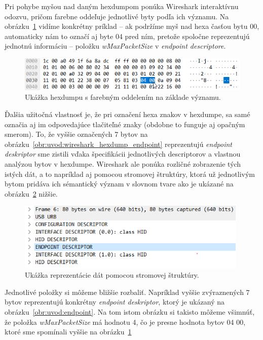 Pri pohybe myšou nad daným hexdumpom ponúka Wireshark interaktívnu odozvu, pričom farebne oddeľuje jednotlivé byty podľa ich významu. Na obrázku~\ref{obr:uvod:wireshark_hexdump_data_selection} vidíme konkrétny príklad -- ak podržíme myš nad hexa časťou bytu 00, automaticky nám to označí aj byte 04 pred ním, pretože spoločne reprezentujú jednotnú informáciu -- položku \textit{wMaxPacketSize} v \textit{endpoint descriptore}.

\begin{figure}[!htb]
	\centering
	\includegraphics[width=12cm]{img/uvod_wireshark_data_selection}
	\caption{Ukážka hexdumpu s farebným oddelením na základe významu.}
	\label{obr:uvod:wireshark_hexdump_data_selection}
\end{figure}

Ďalšia užitočná vlastnosť je, že pri označení hexa znakov v hexdumpe, sa samé označia aj im odpovedajúce tlačiteľné znaky (obdobne to funguje aj opačným smerom). To, že vyššie označených 7 bytov na obrázku~\ref{obr:uvod:wireshark_hexdump_endpoint} reprezentujú \textit{endpoint deskriptor} sme zistili vďaka špecifikácii jednotlivých descriptorov a vlastnou analýzou bytov v hexdumpe. Wireshark ale ponúka rozličné zobrazenie tých istých dát, a to napríklad aj pomocou stromovej štruktúry, ktorá už jednotlivým bytom pridáva ich sémantický význam v slovnom tvare ako je ukázané na obrázku~\ref{obr:uvod:tree_structure} nižšie.

\begin{figure}[!htb]
	\centering
	\includegraphics[width=11cm]{img/uvod_tree_structure}
	\caption{Ukážka reprezentácie dát pomocou stromovej štruktúry.}
	\label{obr:uvod:tree_structure}
\end{figure}

 Jednotlivé položky si môžeme bližšie rozbaliť. Napríklad vyššie zvýraznených 7 bytov reprezentujú konkrétny \textit{endpoint deskriptor}, ktorý je ukázaný na obrázku~\ref{obr:uvod:endpoint}. Na tom istom obrázku si takisto môžeme všimnúť, že položka \textit{wMaxPacketSize} má hodnotu 4, čo je presne hodnota bytov 04 00, ktoré sme spomínali vyššie na obrázku~\ref{obr:uvod:wireshark_hexdump_data_selection}

